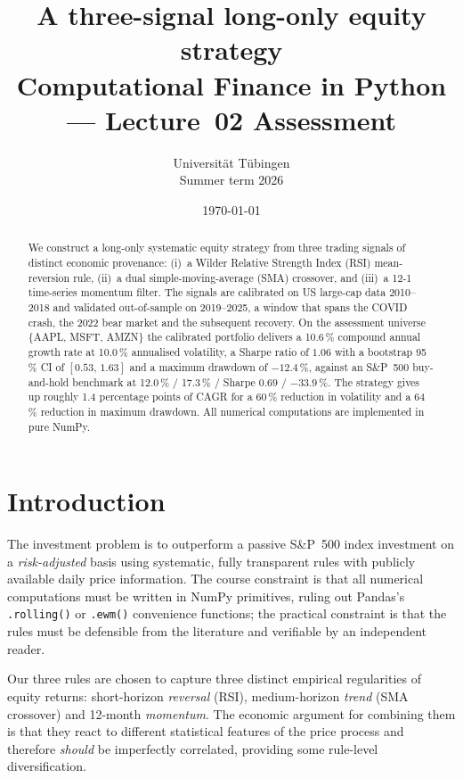 \documentclass[11pt,a4paper]{article}
\title{
  \vspace{-1.4cm}
  \textbf{A three-signal long-only equity strategy} \\[2pt]
  \large Computational Finance in Python --- Lecture~02 Assessment
}
\author{Universit\"at T\"ubingen \\ Summer term 2026}
\date{\today}
\begin{document}
\maketitle

\vspace{-0.5cm}
\begin{abstract}
\noindent
We construct a long-only systematic equity strategy from three trading signals
of distinct economic provenance: (i)~a Wilder Relative Strength Index (RSI)
mean-reversion rule, (ii)~a dual simple-moving-average (SMA) crossover, and
(iii)~a 12-1 time-series momentum filter. The signals are calibrated on US
large-cap data 2010--2018 and validated out-of-sample on 2019--2025, a window
that spans the COVID crash, the 2022 bear market and the subsequent recovery.
On the assessment universe \{AAPL, MSFT, AMZN\} the calibrated portfolio
delivers a 10.6\,\% compound annual growth rate at 10.0\,\% annualised
volatility, a Sharpe ratio of $1.06$ with a bootstrap 95\,\% CI of
$[0.53,\,1.63]$ and a maximum drawdown of $-12.4\,\%$, against an S\&P~500
buy-and-hold benchmark at 12.0\,\% / 17.3\,\% / Sharpe $0.69$ /
$-33.9\,\%$. The strategy gives up roughly 1.4 percentage points of CAGR for
a 60\,\% reduction in volatility and a 64\,\% reduction in maximum drawdown.
All numerical computations are implemented in pure NumPy.
\end{abstract}

\section{Introduction}

The investment problem is to outperform a passive S\&P~500 index investment
on a \emph{risk-adjusted} basis using systematic, fully transparent rules
with publicly available daily price information. The course constraint is
that all numerical computations must be written in NumPy primitives, ruling
out Pandas's \verb|.rolling()| or \verb|.ewm()| convenience functions; the
practical constraint is that the rules must be defensible from the
literature and verifiable by an independent reader.

Our three rules are chosen to capture three distinct empirical
regularities of equity returns: short-horizon \emph{reversal}
(RSI), medium-horizon \emph{trend} (SMA crossover) and 12-month
\emph{momentum}. The economic argument for combining them is that they react
to different statistical features of the price process and therefore
\emph{should} be imperfectly correlated, providing some rule-level
diversification.
\end{document}
